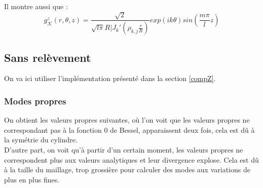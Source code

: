 Il montre aussi que :
\[
g_\mathcal{K}^z(r,\theta,z) = \frac{\sqrt{2}}{\sqrt{l\pi}R|J_k'\left(\rho_{k,j}\frac{r}{R}\right)}exp(ik\theta)sin\left(\frac{m\pi}{l}z\right)
\]

\subsection{Sans relèvement}
\label{resZSR}

On va ici utiliser l'implémentation présenté dans la section \ref{compZ}.

\subsubsection{Modes propres}
On obtient les valeurs propres suivantes, où l'on voit que les valeurs propres ne correspondant pas à la fonction 0 de Bessel, apparaissent deux fois, cela est dû à la symétrie du cylindre.\\
D'autre part, on voit qu'à partir d'un certain moment, les valeurs propres ne correspondent plus aux valeurs analytiques et leur divergence explose. Cela est dû à la taille du maillage, trop grossière pour calculer des modes aux variations de plus en plus fines.\\
